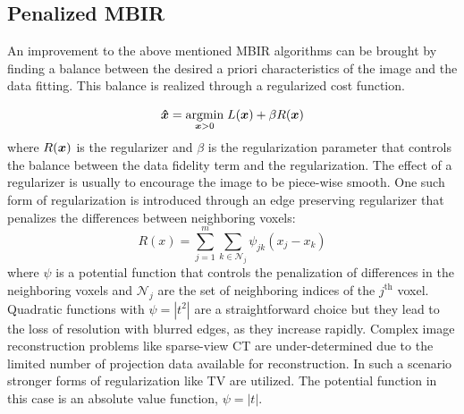 \subsection{Penalized MBIR}
An improvement to the above mentioned \ac{MBIR} algorithms can be brought by finding a balance between the desired a priori characteristics of the image and the data fitting. This balance is realized through a regularized cost function.

\begin{equation}\label{eq:p_mbir}
\bm{\hat{x}}=\underset{\bm{x} > 0}{\operatorname{argmin}} \; L(\bm{x}) + \beta R(\bm{x})
\end{equation}
where $R(\bm{x})$ is the regularizer and $\beta$ is the regularization parameter that controls the balance between the data fidelity term and the regularization. The effect of a regularizer is usually to encourage the image to be piece-wise smooth.  
One such form of regularization is introduced through an edge preserving regularizer that penalizes the differences between neighboring voxels:
\begin{equation}
R(x)=\sum_{j=1}^{m} \sum_{k \in \mathcal{N}_{j}} \psi_{j k}\left(x_{j}-x_{k}\right)
\end{equation}
where $\psi$ is a potential function that controls the penalization of differences in the neighboring voxels and $\mathcal{N}_{j}$ are the set of neighboring indices of the $j^\mathrm{th}$ voxel. Quadratic functions with $\psi = |t^2|$ are a straightforward choice but they lead to the loss of resolution with blurred edges, as they increase rapidly. Complex image reconstruction problems like sparse-view \ac{CT} are under-determined due to the limited number of projection data available for reconstruction. In such a scenario stronger forms of regularization like \ac{TV} are utilized. The potential function in this case is an absolute value function, $\psi = |t|$. 

